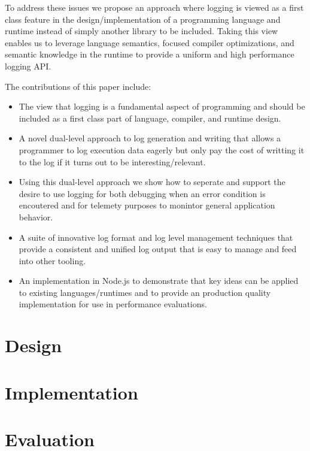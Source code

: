 \documentclass[sigplan,10pt,review]{acmart}
\begin{document}
To address these issues we propose an approach where logging is viewed as a first 
class feature in the design/implementation of a programming language and runtime 
instead of simply another library to be included. Taking this view enables us to 
leverage language semantics, focused compiler optimizations, and semantic knowledge 
in the runtime to provide a uniform and high performance logging API.

\noindent
The contributions of this paper include:
\begin{itemize}
\item The view that logging is a fundamental aspect of programming and should be
included as a first class part of language, compiler, and runtime design.

\item A novel dual-level approach to log generation and writing that allows a
programmer to log execution data eagerly but only pay the cost of writting it to
the log if it turns out to be interesting/relevant.

\item Using this dual-level approach we show how to seperate and support the 
desire to use logging for both debugging when an error condition is encoutered 
and for telemety purposes to monintor general application behavior. 

\item A suite of innovative log format and log level management techniques that 
provide a consistent and unified log output that is easy to manage and feed into 
other tooling.

\item An implementation in Node.js to demonstrate that key ideas can be applied 
to existing languages/runtimes and to provide an production quality implementation 
for use in performance evaluations.
\end{itemize}

\section{Design}
\label{sec:design}


\section{Implementation}
\label{sec:implementation}


\section{Evaluation}
\label{sec:evaluation}

\end{document}
